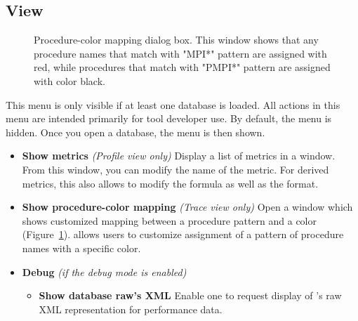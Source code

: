 
\subsection{View}

\begin{figure}[t]
\caption{Procedure-color mapping dialog box. This window shows that any procedure names that match with "MPI*" pattern are assigned with red, while procedures that match with "PMPI*" pattern are assigned with color black.}
\label{fig:hpctraceviewer-mapping}
\end{figure}


This menu is only visible if at least one database is loaded.
All actions in this menu are intended primarily for tool developer use. 
By default, the menu is hidden. Once you open a database, the menu is then shown.

\begin{itemize}

 \item \textbf{Show metrics}   \textit{(Profile view only)}
 Display a list of metrics in a window. From this window, you can modify the name of the metric. For derived metrics, this also allows to modify the formula as well as the format.

 \item \textbf{Show procedure-color mapping} \textit{(Trace view only)} 
  Open a window which shows customized mapping between a procedure pattern and a color (Figure~\ref{fig:hpctraceviewer-mapping}). \hpctraceviewer{} allows users to customize assignment of a pattern of procedure names with a specific color.
 
 \item \textbf{Debug} \emph{(if the debug mode is enabled)}

   \begin{itemize}
     \item \textbf{Show database raw's XML}
 	Enable one to request display of \HPCToolkit{}'s raw XML representation for performance data.

  \end{itemize}

\end{itemize}

